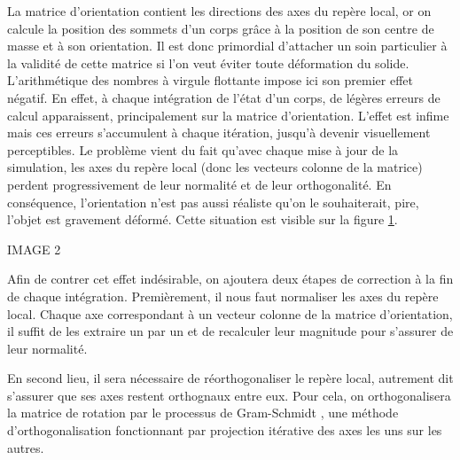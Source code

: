 La matrice d'orientation contient les directions des axes du repère
local, or on calcule la position des sommets d'un corps grâce à la
position de son centre de masse et à son orientation. Il est donc
primordial d'attacher un soin particulier à la validité de cette
matrice si l'on veut éviter toute déformation du
solide. L'arithmétique des nombres à virgule flottante impose ici son
premier effet négatif. En effet, à chaque intégration de l'état d'un
corps, de légères erreurs de calcul apparaissent, principalement sur
la matrice d'orientation. L'effet est infime mais ces erreurs
s'accumulent à chaque itération, jusqu'à devenir visuellement
perceptibles. Le problème vient du fait qu'avec chaque mise à jour de
la simulation, les axes du repère local (donc les vecteurs colonne de
la matrice) perdent progressivement de leur normalité et de leur
orthogonalité. En conséquence, l'orientation n'est pas aussi réaliste
qu'on le souhaiterait, pire, l'objet est gravement déformé. Cette
situation est visible sur la figure \ref{grahm}.

IMAGE 2
\begin{figure}
  \centering
  \caption{}
  \label{grahm}
\end{figure}

Afin de contrer cet effet indésirable, on ajoutera deux étapes de
correction à la fin de chaque intégration. Premièrement, il nous faut
normaliser les axes du repère local. Chaque axe correspondant à un
vecteur colonne de la matrice d'orientation, il suffit de les extraire
un par un et de recalculer leur magnitude pour s'assurer de leur
normalité.

En second lieu, il sera nécessaire de réorthogonaliser le repère
local, autrement dit s'assurer que ses axes restent orthognaux entre
eux. Pour cela, on orthogonalisera la matrice de rotation par le
processus de Gram-Schmidt \cite{weber}, une méthode
d'orthogonalisation fonctionnant par projection itérative des axes les
uns sur les autres.

